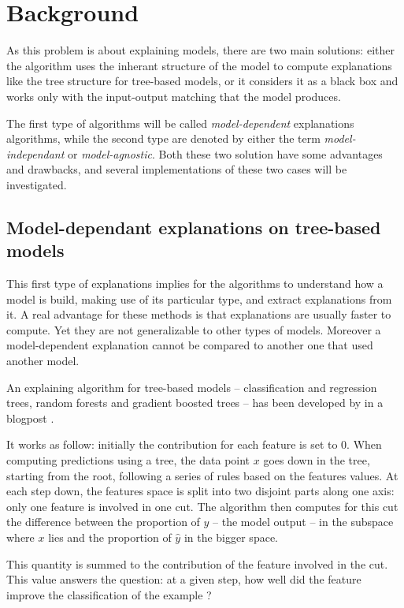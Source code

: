 \documentclass[a4paper,11pt]{kth-mag}
\begin{document}
\chapter{Background}

As this problem is about explaining models, there are two main solutions: either the algorithm uses the inherant structure of the model to compute explanations like the tree structure for tree-based models, or it considers it as a black box and works only with the input-output matching that the model produces.

The first type of algorithms will be called \textit{model-dependent} explanations algorithms, while the second type are denoted by either the term \textit{model-independant} or \textit{model-agnostic}. Both these two solution have some advantages and drawbacks, and several implementations of these two cases will be investigated.

\section{Model-dependant explanations on tree-based models}

This first type of explanations implies for the algorithms to understand how a model is build, making use of its particular type, and extract explanations from it. A real advantage for these methods is that explanations are usually faster to compute. Yet they are not generalizable to other types of models. Moreover a model-dependent explanation cannot be compared to another one that used another model.

An explaining algorithm for tree-based models -- classification and regression trees, random forests and gradient boosted trees -- has been developed by \citeauthor{treeinterpreter} in a blogpost \cite{treeinterpreter}.


It works as follow: initially the contribution for each feature is set to 0. When computing predictions using a tree, the data point $x$ goes down in the tree, starting from the root, following a series of rules based on the features values. At each step down, the features space is split into two disjoint parts along one axis: only one feature is involved in one cut. The algorithm then computes for this cut the difference between the proportion of $\hat{y}$ -- the model output -- in the subspace where $x$ lies and the proportion of $\hat{y}$ in the bigger space.

This quantity is summed to the contribution of the feature involved in the cut. This value answers the question: at a given step, how well did the feature improve the classification of the example ?
\end{document}
